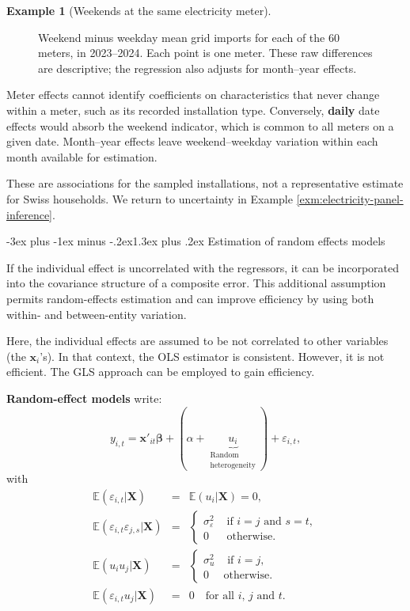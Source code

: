 \documentclass[
  11pt,
]{book}
\makeatletter
\renewcommand\section{\@startsection{section}{1}{\z@}
  {-3ex plus -1ex minus -.2ex}{1.3ex plus .2ex}
  {\normalfont\Large\bfseries\color{TextbookInk}}}
\theoremstyle{definition}
\theoremstyle{definition}
\newtheorem{example}{Example}[chapter]
\theoremstyle{definition}
\theoremstyle{definition}
\theoremstyle{remark}
\makeatother
\begin{document}
\begin{example}[Weekends at the same electricity meter]
\begin{figure}
{}

\caption{Weekend minus weekday mean grid imports for each of the 60 meters, in 2023--2024. Each point is one meter. These raw differences are descriptive; the regression also adjusts for month--year effects.}\label{fig:electricity-meter-differences}
\end{figure}

Meter effects cannot identify coefficients on characteristics that never change within a meter, such as its recorded installation type. Conversely, \textbf{daily} date effects would absorb the weekend indicator, which is common to all meters on a given date. Month--year effects leave weekend--weekday variation within each month available for estimation.

These are associations for the sampled installations, not a representative estimate for Swiss households. We return to uncertainty in Example \ref{exm:electricity-panel-inference}.
\end{example}

\section{Estimation of random effects models}\label{RandomEffect}

If the individual effect is uncorrelated with the regressors, it can be incorporated into the covariance structure of a composite error. This additional assumption permits random-effects estimation and can improve efficiency by using both within- and between-entity variation.

Here, the individual effects are assumed to be not correlated to other variables (the \(\mathbf{x}_i\)'s). In that context, the OLS estimator is consistent. However, it is not efficient. The GLS approach can be employed to gain efficiency.


\textbf{Random-effect models} write:
\[
y_{i,t}=\mathbf{x}'_{it}\boldsymbol\beta + (\alpha + \underbrace{u_i}_{\substack{\text{Random}\\\text{heterogeneity}}}) + \varepsilon_{i,t},
\]
with
\begin{eqnarray*}
\mathbb{E}(\varepsilon_{i,t}|\mathbf{X})&=&\mathbb{E}(u_{i}|\mathbf{X}) =0,\\
\mathbb{E}(\varepsilon_{i,t}\varepsilon_{j,s}|\mathbf{X}) &=&
\left\{
\begin{array}{cl}
\sigma_\varepsilon^2 & \mbox{ if $i=j$ and $s=t$},\\
0 & \mbox{ otherwise.}
\end{array}
\right.\\
\mathbb{E}(u_{i}u_{j}|\mathbf{X}) &=&
\left\{
\begin{array}{cl}
\sigma_u^2 & \mbox{ if $i=j$},\\
0 & \mbox{otherwise.}
\end{array}
\right.\\
\mathbb{E}(\varepsilon_{i,t}u_{j}|\mathbf{X})&=&0 \quad \text{for all $i$, $j$ and $t$}.
\end{eqnarray*}
\end{document}
